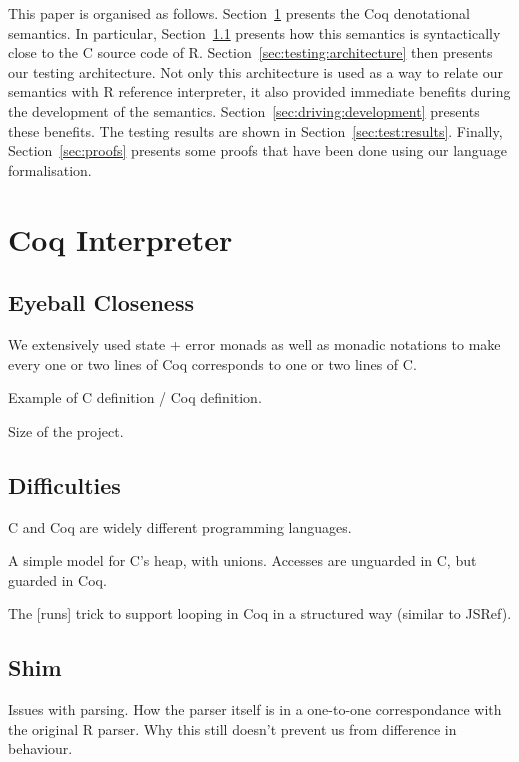\documentclass[
    sigplan,
    10pt,
    review, %
    natbib=false %
 ]{acmart}
\begin{document}
This paper is organised as follows.
Section~\ref{sec:coq:interp} presents the Coq denotational semantics.
In particular, Section~\ref{sec:eyeball:closeness} presents
how this semantics is syntactically close to the C source code of R.
Section~\ref{sec:testing:architecture} then presents our testing architecture.
Not only this architecture is used as a way to relate our semantics
with R reference interpreter,
it also provided immediate benefits during the development of the semantics.
Section~\ref{sec:driving:development} presents these benefits.
The testing results are shown in Section~\ref{sec:test:results}.
Finally, Section~\ref{sec:proofs} presents some proofs that have been done
using our language formalisation.

\section{Coq Interpreter}
\label{sec:coq:interp}

\subsection{Eyeball Closeness}
\label{sec:eyeball:closeness}

We extensively used state + error monads as well as monadic notations
to make every one or two lines of Coq corresponds to one or two lines of C.

Example of C definition / Coq definition.

Size of the project.

\subsection{Difficulties}
\label{sec:coq:difficulties}

C and Coq are widely different programming languages.

A simple model for C’s heap, with unions.
Accesses are unguarded in C, but guarded in Coq.

The [runs] trick to support looping in Coq in a structured way (similar to JSRef).

\subsection{Shim}
\label{sec:shim}

Issues with parsing.
How the parser itself is in a one-to-one correspondance with the original R parser.
Why this still doesn’t prevent us from difference in behaviour.
\end{document}

